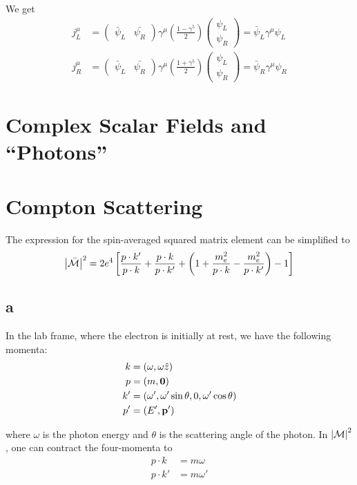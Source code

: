 \documentclass[11pt, a4paper]{amsart}
\begin{document}
We get
\begin{align}
j_L^\mu &= \begin{pmatrix}
\bar{\psi}_L & \bar{\psi_R}
\end{pmatrix}\gamma^\mu \left(\frac{1 - \gamma^5}{2}\right) 
\begin{pmatrix}
\psi_L \\
\psi_R
\end{pmatrix} = \bar{\psi}_L \gamma^\mu \psi_L \\
j_R^\mu &= \begin{pmatrix}
\bar{\psi}_L & \bar{\psi_R}
\end{pmatrix}\gamma^\mu \left(\frac{1 + \gamma^5}{2}\right) 
\begin{pmatrix}
\psi_L \\
\psi_R
\end{pmatrix} = \bar{\psi}_R \gamma^\mu \psi_R
\end{align}


\section{Complex Scalar Fields and ``Photons''}

\section{Compton Scattering}
The expression for the spin-averaged squared matrix element can be simplified to
\begin{equation}
\abs{\bar{\mathcal{M}}}^2 = 2e^4 \left[\frac{p\cdot k'}{p\cdot k} + \frac{p \cdot k}{p \cdot k'} + \left(1 + \frac{m_e^2}{p\cdot k} - \frac{m_e^2}{p\cdot k'} \right) - 1 \right]
\end{equation}

\subsection{a}

In the lab frame, where the electron is initially at rest, we have the following momenta:
\begin{align}
k  &= (\omega, \omega\hat{z}) \\
p  &= (m, \vb{0}) \\
k' &= (\omega', \omega' \sin \theta, 0, \omega' \cos \theta) \\
p' &= (E', \vb{p}')
\end{align}

where $\omega$ is the photon energy and $\theta$ is the scattering angle of the photon. In $\abs{\mathcal{M}}^2$, one can contract the four-momenta to
\begin{align}
p \cdot k \   &= m \omega \label{eq:dot1}\\
p \cdot k' &= m \omega' \label{eq:dot2}
\end{align}
\end{document}
